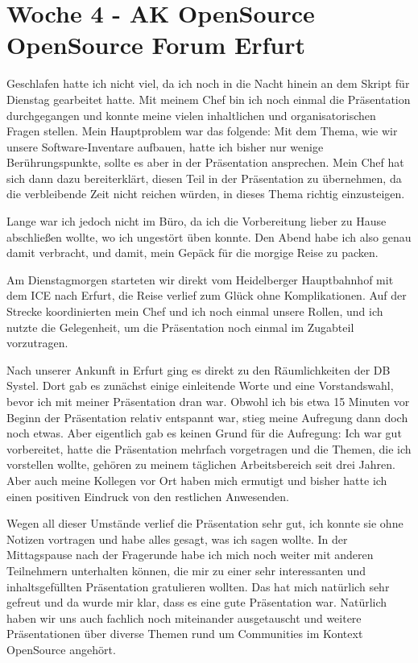 \section{Woche 4 - AK OpenSource \headerand OpenSource Forum Erfurt} \label{sec:bericht-wo-4}



Geschlafen hatte ich nicht viel, da ich noch in die Nacht hinein an dem Skript für Dienstag gearbeitet hatte.
Mit meinem Chef bin ich noch einmal die Präsentation durchgegangen und konnte meine vielen inhaltlichen und organisatorischen Fragen stellen.
Mein Hauptproblem war das folgende: Mit dem Thema, wie wir unsere Software-Inventare aufbauen, hatte ich bisher nur wenige Berührungspunkte, sollte es aber in der Präsentation ansprechen.
Mein Chef hat sich dann dazu bereiterklärt, diesen Teil in der Präsentation zu übernehmen, da die verbleibende Zeit nicht reichen würden, in dieses Thema richtig einzusteigen.

Lange war ich jedoch nicht im Büro, da ich die Vorbereitung lieber zu Hause abschließen wollte, wo ich ungestört üben konnte.
Den Abend habe ich also genau damit verbracht, und damit, mein Gepäck für die morgige Reise zu packen.


Am Dienstagmorgen starteten wir direkt vom Heidelberger Hauptbahnhof mit dem ICE nach Erfurt, die Reise verlief zum Glück ohne Komplikationen.
Auf der Strecke koordinierten mein Chef und ich noch einmal unsere Rollen, und ich nutzte die Gelegenheit, um die Präsentation noch einmal im Zugabteil vorzutragen.

Nach unserer Ankunft in Erfurt ging es direkt zu den Räumlichkeiten der DB Systel.
Dort gab es zunächst einige einleitende Worte und eine Vorstandswahl, bevor ich mit meiner Präsentation dran war.
Obwohl ich bis etwa 15 Minuten vor Beginn der Präsentation relativ entspannt war, stieg meine Aufregung dann doch noch etwas.
Aber eigentlich gab es keinen Grund für die Aufregung:
Ich war gut vorbereitet, hatte die Präsentation mehrfach vorgetragen und die Themen, die ich vorstellen wollte, gehören zu meinem täglichen Arbeitsbereich seit drei Jahren.
Aber auch meine Kollegen vor Ort haben mich ermutigt und bisher hatte ich einen positiven Eindruck von den restlichen Anwesenden.

Wegen all dieser Umstände verlief die Präsentation sehr gut, ich konnte sie ohne Notizen vortragen und habe alles gesagt, was ich sagen wollte.
In der Mittagspause nach der Fragerunde habe ich mich noch weiter mit anderen Teilnehmern unterhalten können, die mir zu einer sehr interessanten und inhaltsgefüllten Präsentation gratulieren wollten.
Das hat mich natürlich sehr gefreut und da wurde mir klar, dass es eine gute Präsentation war.
Natürlich haben wir uns auch fachlich noch miteinander ausgetauscht und weitere Präsentationen über diverse Themen rund um Communities im Kontext OpenSource angehört.

